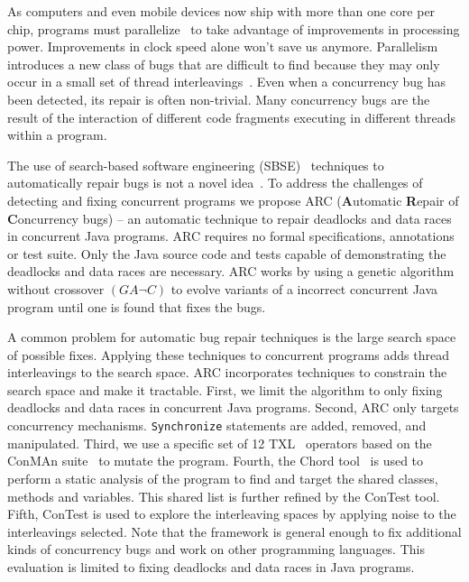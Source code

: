 \documentclass{llncs}
\begin{document}
As computers and even mobile devices now ship with more than one core per chip, programs must parallelize~\cite{SL05} to take advantage of improvements in processing power. Improvements in clock speed alone won't save us anymore. Parallelism introduces a new class of bugs that are difficult to find because they may only occur in a small set of thread interleavings~\cite{MQB07}. Even when a concurrency bug has been detected, its repair is often non-trivial. Many concurrency bugs are the result of the interaction of different code fragments executing in different threads within a program. 

The use of search-based software engineering (SBSE)~\cite{Har+10} techniques to automatically repair bugs is not a novel idea~\cite{FNWG09, WNLF09, NWLF09, WFGN10, GNFW11, LDFW12}. To address the challenges of detecting and fixing concurrent programs we propose ARC (\textbf{A}utomatic \textbf{R}epair of \textbf{C}oncurrency bugs) -- an automatic technique to repair deadlocks and data races in concurrent Java programs. ARC requires no formal specifications, annotations or test suite. Only the Java source code and tests capable of demonstrating the deadlocks and data races are necessary. ARC works by using a genetic algorithm without crossover $(GA \neg C)$ to evolve variants of a incorrect concurrent Java program until one is found that fixes the bugs.

A common problem for automatic bug repair techniques is the large search space of possible fixes. Applying these techniques to  concurrent programs adds thread interleavings to the search space. ARC incorporates techniques to constrain the search space and make it tractable. First, we limit the algorithm to only fixing deadlocks and data races in concurrent Java programs. Second, ARC only targets concurrency mechanisms. \texttt{Synchronize} statements are added, removed, and manipulated. Third, we use a specific set of 12 TXL~\cite{CHP91} operators based on the ConMAn suite~\cite{BCD06} to mutate the program.  Fourth, the Chord tool~\cite{NA07} is used to perform a static analysis of the program to find and target the shared classes, methods and variables. This shared list is further refined by the ConTest tool. Fifth, ConTest is used to explore the interleaving spaces by applying noise to the interleavings selected.  Note that the framework is general enough to fix additional kinds of concurrency bugs and work on other programming languages. This evaluation is limited to fixing deadlocks and data races in Java programs.
\end{document}
